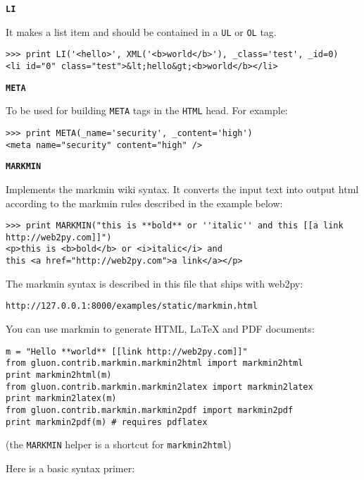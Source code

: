 \documentclass[justified,sixbynine,notoc]{tufte-book}
\def\ft{\small\tt}
\def\inxx#1{\index{#1}}
\begin{document}
\begin{fullwidth}
{\bf {\ft LI}}

It makes a list item and should be contained in a {\ft UL} or {\ft OL} tag.

\inxx{LI}
\begin{lstlisting}
>>> print LI('<hello>', XML('<b>world</b>'), _class='test', _id=0)
<li id="0" class="test">&lt;hello&gt;<b>world</b></li>
\end{lstlisting}

{\bf {\ft META}}

To be used for building {\ft META} tags in the {\ft HTML} head. For example:

\inxx{META}
\begin{lstlisting}
>>> print META(_name='security', _content='high')
<meta name="security" content="high" />
\end{lstlisting}

{\bf {\ft MARKMIN}}

Implements the markmin wiki syntax. It converts the input text into output html according to the markmin rules described in the example below:

\inxx{MARKMIN}
\begin{lstlisting}
>>> print MARKMIN("this is **bold** or ''italic'' and this [[a link http://web2py.com]]")
<p>this is <b>bold</b> or <i>italic</i> and
this <a href="http://web2py.com">a link</a></p>
\end{lstlisting}

The markmin syntax is described in this file that ships with web2py:
\begin{lstlisting}[keywords={}]
http://127.0.0.1:8000/examples/static/markmin.html
\end{lstlisting}

You can use markmin to generate HTML, LaTeX and PDF documents:

\begin{lstlisting}
m = "Hello **world** [[link http://web2py.com]]"
from gluon.contrib.markmin.markmin2html import markmin2html
print markmin2html(m)
from gluon.contrib.markmin.markmin2latex import markmin2latex
print markmin2latex(m)
from gluon.contrib.markmin.markmin2pdf import markmin2pdf
print markmin2pdf(m) # requires pdflatex
\end{lstlisting}

(the {\ft MARKMIN} helper is a shortcut for {\ft markmin2html})

Here is a basic syntax primer:


\end{fullwidth}
\end{document}
